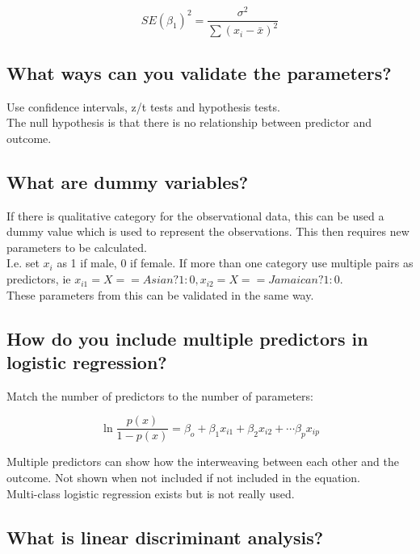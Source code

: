 \documentclass[11pt]{scrartcl} %
\begin{document}
\begin{equation}
	SE(\beta_1)^2 = \frac{\sigma^2}{\sum{(x_i-\bar{x})^2}}
\end{equation}



\subsection{What ways can you validate the parameters?}

Use confidence intervals, z/t tests and hypothesis tests.\\

The null hypothesis is that there is no relationship between predictor and outcome.

\subsection{What are dummy variables?}

If there is qualitative category for the observational data, this can be used a dummy value which is used to represent
the observations. This then requires new parameters to be calculated.\\

I.e. set \(x_i\) as 1 if male, 0 if female. If more than one category use multiple pairs as predictors, ie 
\(x_{i1} = X==Asian?1:0, x_{i2} = X==Jamaican?1:0\).\\

These parameters from this can be validated in the same way.

\subsection{How do you include multiple predictors in logistic regression?}

Match the number of predictors to the number of parameters:

\begin{equation}
	\ln\frac{p(x)}{1-p(x)} = \beta_o + \beta_1x_{i1} + \beta_2x_{i2} + \cdots \beta_px_{ip}
\end{equation}

Multiple predictors can show how the interweaving between each other and the outcome. Not shown when not included if 
not included in the equation.\\

Multi-class logistic regression exists but is not really used.

\subsection{What is linear discriminant analysis?}
\end{document}
